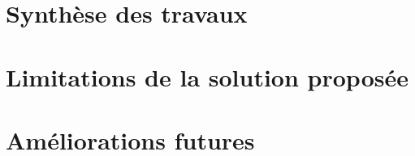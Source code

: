 \label{sec:Conclusion}

\section{Synthèse des travaux}

\section{Limitations de la solution proposée}\label{sec:Limitations}

\section{Améliorations futures}
